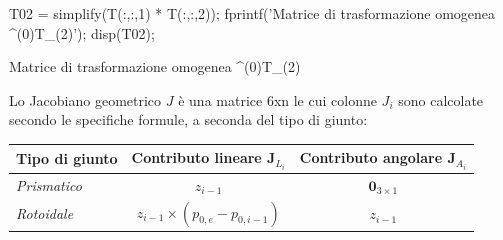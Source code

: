 \documentclass[11pt, a4paper]{article}
\begin{document}
\begin{matlabcode}
T02 = simplify(T(:,:,1) * T(:,:,2));
fprintf('Matrice di trasformazione omogenea ^(0)T_(2)');
disp(T02);
\end{matlabcode}
\begin{matlaboutput}
Matrice di trasformazione omogenea ^(0)T_(2)
\end{matlaboutput}
\newpage
\begin{par}
\begin{flushleft}
Lo Jacobiano geometrico $J$ è una matrice 6xn le cui colonne $J_i$ sono calcolate secondo le specifiche formule, a seconda del tipo di giunto:
\end{flushleft}
\end{par}

\begin{par}

\begin{table}[h]
    \centering
    \renewcommand{\arraystretch}{1.2} %
    \begin{tabular}{|l|c|c|}
        \hline
        \textbf{Tipo di giunto} & \textbf{Contributo lineare} \(\mathbf{J}_{L_{i}}\) & \textbf{Contributo angolare} \(\mathbf{J}_{A_{i}}\) \\
        \hline
        \textit{Prismatico} & \(z_{i-1}\) & \(\mathbf{0}_{3 \times 1}\) \\
        \hline
        \textit{Rotoidale} & \(z_{i-1} \times (p_{0,e} - p_{0,i-1})\) & \(z_{i-1}\) \\
        \hline
    \end{tabular}
\end{table}

\end{par}
\end{document}
